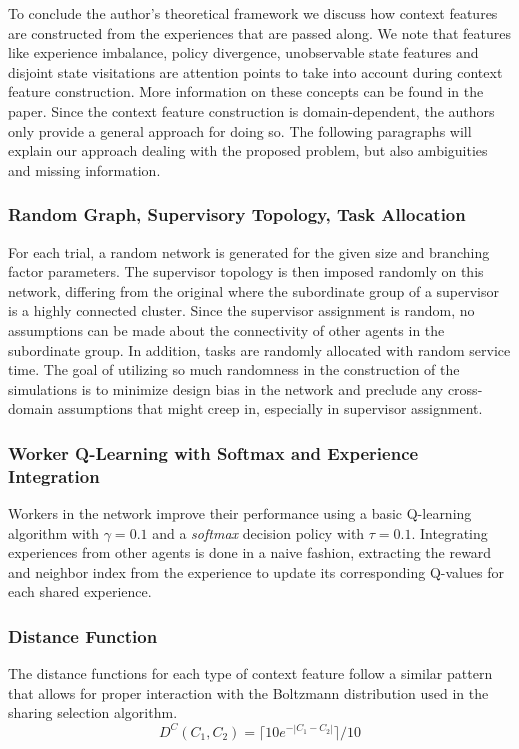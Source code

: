 \documentclass[letterpaper]{article}
\begin{document}
To conclude the author’s theoretical framework we discuss how context features are constructed from the experiences that are passed along. We note that features like experience imbalance, policy divergence, unobservable state features and disjoint state visitations are attention points to take into account during context feature construction. More information on these concepts can be found in the paper. Since the context feature construction is domain-dependent, the authors only provide a general approach for doing so. The following paragraphs will explain our approach dealing with the proposed problem, but also ambiguities and missing information.

\subsubsection{Random Graph, Supervisory Topology, Task Allocation}
For each trial, a random network is generated for the given size and branching factor parameters. The supervisor topology is then imposed randomly on this network, differing from the original where the subordinate group of a supervisor is a highly connected cluster.  Since the supervisor assignment is random, no assumptions can be made about the connectivity of other agents in the subordinate group. In addition, tasks are randomly allocated with random service time. The goal of utilizing so much randomness in the construction of the simulations is to minimize design bias in the network and preclude any cross-domain assumptions that might creep in, especially in supervisor assignment.

\subsubsection{Worker Q-Learning with Softmax and Experience Integration}
Workers in the network improve their performance using a basic Q-learning algorithm with $\gamma = 0.1$ and a \textit{softmax} decision policy with $\tau = 0.1$.  Integrating experiences from other agents is done in a naive fashion, extracting the reward and neighbor index from the experience to update its corresponding Q-values for each shared experience.

\subsubsection{Distance Function}
The distance functions for each type of context feature follow a similar pattern that allows for proper interaction with the Boltzmann distribution used in the sharing selection algorithm.
\[D^C(C_1, C_2) = \lceil 10e^{-| C_1 - C_2 |} \rceil / 10\]
\end{document}
